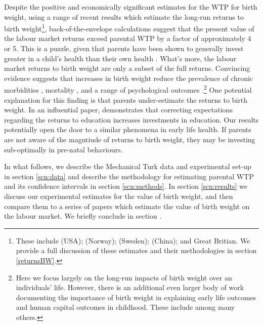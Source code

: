 \documentclass[a4paper, 11pt]{article}
\begin{document}
\begin{spacing}{1.4}
Despite the positive and economically significant estimates for the
WTP for birth weight, using a range of recent results which estimate
the long-run returns to birth weight\footnote{These include
  \citet{JohnsonSchoeni2011,CookFletcher2015,BehrmanRosenzweig2004} (USA);
  \citet{Blacketal2007} (Norway); \citet{Bharadwajetal2015} (Sweden);
  \citet{RosenzweigZhang2013} (China); and \citet{CurrieHyson1999,
    Caseetal2005} Great Britian.  We provide a full discussion of these
  estimates and their methodologies in section \ref{returnsBW}.},
back-of-the-envelope calculations suggest that the present value of the
labour market returns exceed parental WTP by a factor
of approximately 4 or 5. This is a puzzle, given that parents have been
shown to generally invest greater in a child's health than their own
health \citep{AgeeCrocker2008}. What's more, the labour market returns
to birth weight are only a subset of the full returns.  Convincing
evidence suggests that increases in birth weight reduce the prevalence
of chronic morbidities \citep{Barker1995,AlmondMazumder2005,
  JohnsonSchoeni2011b}, mortality \citep{vandenBergetal2006}, and a
range of psychological outcomes \citep{Fletcher2011}.\footnote{Here we
  focus largely on the long-run impacts of birth weight over an
  individuals' life.  However, there is an additional even larger body of
  work documenting the importance of birth weight in explaining early life
  outcomes and human capital outcomes in childhood. These include
  \citet{Almondetal2005,Oreopoulosetal2008,Guptaetal2013,Conleyetal2003,
    Figlioetal2014,LinLiu2009,Fletcher2011,Bharadwajetal2017,
    TorcheEchevarria2011} among many others.} 
One potential explanation for this finding is that parents under-estimate
the returns to birth weight.  In an influential paper, \citet{Jensen2010}
demonstrates that correcting expectations regarding the returns to
education increases investments in education.  Our results potentially
open the door to a similar phenomena in early life health.  If parents
are not aware of the magntiude of returns to birth weight, they may be
investing sub-optimally in pre-natal behaviours.

In what follows, we describe the Mechanical Turk data and experimental
set-up in section \ref{scn:data} and describe the methodology for
estimating parental WTP and its confidence intervals in section
\ref{scn:methods}.  In section \ref{scn:results} we discuss our
experimental estimates for the value of birth weight, and then compare
them to a series of papers which estimate the value of birth weight on
the labour market.  We briefly conclude in section \label{scn:conclusion}.


\end{spacing}
\end{document}
